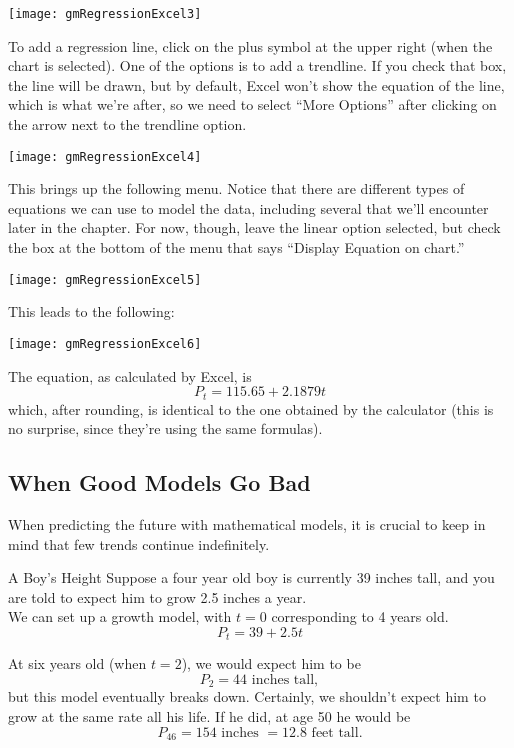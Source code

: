 \begin{center}
\texttt{[image: gmRegressionExcel3]}
\end{center}

To add a regression line, click on the plus symbol at the upper right (when the chart is selected).  One of the options is to add a trendline.  If you check that box, the line will be drawn, but by default, Excel won't show the equation of the line, which is what we're after, so we need to select ``More Options'' after clicking on the arrow next to the trendline option.

\begin{center}
\texttt{[image: gmRegressionExcel4]}
\end{center}

This brings up the following menu.  Notice that there are different types of equations we can use to model the data, including several that we'll encounter later in the chapter.  For now, though, leave the linear option selected, but check the box at the bottom of the menu that says ``Display Equation on chart.''

\begin{center}
\texttt{[image: gmRegressionExcel5]}
\end{center}

This leads to the following:

\begin{center}
\texttt{[image: gmRegressionExcel6]}
\end{center}

The equation, as calculated by Excel, is \[P_t = 115.65 + 2.1879t\] which, after rounding, is identical to the one obtained by the calculator (this is no surprise, since they're using the same formulas).

\subsection{When Good Models Go Bad}
When predicting the future with mathematical models, it is crucial to keep in mind that few trends continue indefinitely.

\begin{example}[https://www.youtube.com/watch?v=7_wAlvsCyDc&list=PLfmpjsIzhztutjEb8Pg5OBOlI1p80yVoy&index=3]{A Boy's Height}
Suppose a four year old boy is currently 39 inches tall, and you are told to expect him to grow 2.5 inches a year.\\

We can set up a growth model, with $t=0$ corresponding to 4 years old.
\[P_t = 39 + 2.5t\]

At six years old (when $t=2$), we would expect him to be
\[P_2 = 44 \textrm{ inches tall},\]
but this model eventually breaks down.  Certainly, we shouldn't expect him to grow at the same rate all his life.  If he did, at age 50 he would be
\[P_{46} = 154 \textrm{ inches } = 12.8 \textrm{ feet tall}.\]
\end{example}

